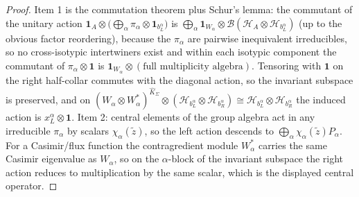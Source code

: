 \documentclass[11pt]{article}
\begin{document}
\begin{proof}
Item 1 is the commutation theorem plus Schur's lemma: the commutant of the unitary action \(\mathbf 1_A\otimes\bigl(\bigoplus_\alpha\pi_\alpha\otimes\mathbf 1_{b_L^\alpha}\bigr)\) is \(\bigoplus_\alpha \mathbf 1_{W_\alpha}\otimes\mathcal B(\mathcal H_A\otimes\mathcal H_{b_L^\alpha})\) (up to the obvious factor reordering), because the \(\pi_\alpha\) are pairwise inequivalent irreducibles, so no cross-isotypic intertwiners exist and within each isotypic component the commutant of \(\pi_\alpha\otimes\mathbf 1\) is \(\mathbf 1_{W_\alpha}\otimes(\text{full multiplicity algebra})\). Tensoring with \(\mathbf 1\) on the right half-collar commutes with the diagonal action, so the invariant subspace is preserved, and on \((W_\alpha\otimes W_\alpha^*)^{\widehat K_\Sigma}\otimes(\mathcal H_{b_L^\alpha}\otimes\mathcal H_{b_R^\alpha})\cong\mathcal H_{b_L^\alpha}\otimes\mathcal H_{b_R^\alpha}\) the induced action is \(x_L^\alpha\otimes\mathbf 1\). Item 2: central elements of the group algebra act in any irreducible \(\pi_\alpha\) by scalars \(\chi_\alpha(\tilde z)\), so the left action descends to \(\bigoplus_\alpha\chi_\alpha(\tilde z)P_\alpha\). For a Casimir/flux function the contragredient module \(W_\alpha^*\) carries the same Casimir eigenvalue as \(W_\alpha\), so on the \(\alpha\)-block of the invariant subspace the right action reduces to multiplication by the same scalar, which is the displayed central operator.
\end{proof}
\end{document}

